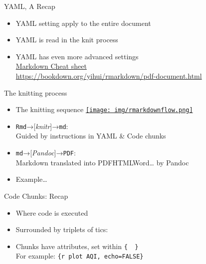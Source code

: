 \documentclass[
  ignorenonframetext,
]{beamer}
\providecommand{\tightlist}{%
  \setlength{\itemsep}{0pt}\setlength{\parskip}{0pt}}
\begin{document}
\begin{frame}{YAML, A Recap}
\protect\hypertarget{yaml-a-recap}{}
\begin{itemize}
\tightlist
\item
  YAML setting apply to the entire document
\item
  YAML is read in the knit process
\item
  YAML has even more advanced settings\\
  \href{https://raw.githubusercontent.com/rstudio/cheatsheets/main/rmarkdown.pdf}{Markdown
  Cheat sheet}\\
  \url{https://bookdown.org/yihui/rmarkdown/pdf-document.html}
\end{itemize}
\end{frame}

\begin{frame}[fragile]{The knitting process}
\protect\hypertarget{the-knitting-process}{}
\begin{itemize}
\tightlist
\item
  The knitting sequence
  \href{https://env872.github.io/assets/images/rmarkdownflow.png}{\texttt{[image: img/rmarkdownflow.png]}}
\item
  \texttt{Rmd}→{[}\emph{knitr}{]}→\texttt{md}:\\
  Guided by instructions in YAML \& Code chunks
\item
  \texttt{md}→{[}\emph{Pandoc}{]}→\texttt{PDF}:\\
  Markdown translated into PDF\textbar HTML\textbar Word\textbar\ldots{}
  by Pandoc
\item
  Example\ldots{}
\end{itemize}
\end{frame}

\begin{frame}[fragile]{Code Chunks: Recap}
\protect\hypertarget{code-chunks-recap}{}
\begin{itemize}
\tightlist
\item
  Where code is executed
\item
  Surrounded by triplets of tics:
  \texttt{\textasciigrave{}\textasciigrave{}\textasciigrave{}}
\item
  Chunks have attributes, set within \texttt{\{\ \ \}}\\
  For example: \texttt{\{r\ plot\ AQI,\ echo=FALSE\}}
\end{itemize}
\end{frame}
\end{document}
